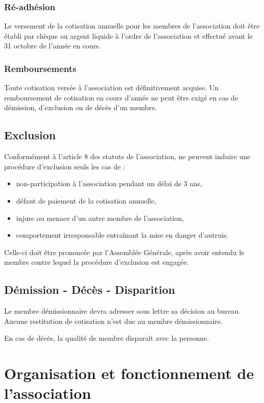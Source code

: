 \documentclass[a4paper,french,10pt]{article}
\begin{document}
\subsubsection*{Ré-adhésion}

Le versement de la cotisation annuelle pour les membres de l'association doit être établi par chèque ou argent liquide à l'ordre de l'association et effectué avant le 31 octobre de l'année en cours.

\subsubsection*{Remboursements}

Toute cotisation versée à l'association est définitivement acquise. Un remboursement de cotisation en cours d'année ne peut être exigé en cas de démission, d'exclusion ou de décès d'un membre.

\subsection{Exclusion}
Conformément à l'article 8 des statuts de l'association, ne peuvent induire une procédure d'exclusion seuls les cas de :
\begin{itemize}
\item non-participation à l'association pendant un délai de 3 ans,
\item défaut de paiement de la cotisation annuelle,
\item injure ou menace d'un autre membre de l'association,
\item comportement irresponsable entraînant la mise en danger d'autruis.
\end{itemize}

Celle-ci doit être prononcée par l'Assemblée Générale, après avoir entendu le membre contre lequel la procédure d'exclusion est engagée.

\subsection{Démission - Décès - Disparition}
Le membre démissionnaire devra adresser sous lettre sa décision au bureau.
Aucune restitution de cotisation n'est due au membre démissionnaire.

En cas de décès, la qualité de membre disparaît avec la personne.

\section{Organisation et fonctionnement de l'association}
\end{document}
